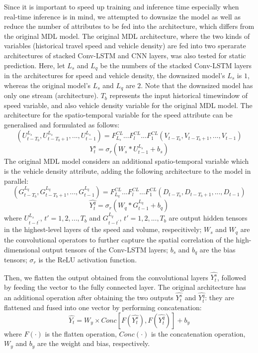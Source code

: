 \documentclass[11pt]{uonthesis}
\begin{document}
Since it is important to speed up training and inference time especially when real-time inference is in mind, we attempted to downsize the model as well as reduce the number of attributes to be fed into the architecture, which differs from the original MDL model. The original MDL architecture, where the two kinds of variables (historical travel speed and vehicle density) are fed into two sperarate architectures of stacked Conv-LSTM and CNN layers, was also tested for static prediction. Here, let $L_s$ and $L_q$ be the numbers of the stacked Conv-LSTM layers in the architectures for speed and vehicle density, the downsized model's $L_s$ is $1$, whereas the original model's $L_s$ and $L_q$ are $2$. Note that the downsized model has only one stream (architecture). $T_b$ represents the input historical timewindow of speed variable, and also vehicle density variable for the original MDL model. The architecture for the spatio-temporal variable for the speed attribute can be generalised and formulated as follows:
\[ (U^{L_s}_{t-T_b}, U^{L_s}_{t-T_b+1},..., U^{L_s}_{t-1}) = F^{CL}_{L_s}...F^{CL}_{l}...F^{CL}_{1} (V_{t-T_b}, V_{t-T_b+1},..., V_{t-1}) \]
\[ \hat{Y^s_{t}} = {\sigma}_r (W_s\ast{U^{L_s}_{t-1}} + b_s) \]
The original MDL model considers an additional spatio-temporal variable which is the vehicle density attribute, adding the following architecture to the model in parallel:
\[ (G^{L_q}_{t-T_b}, G^{L_q}_{t-T_b+1},...,G^{L_q}_{t-1}) = F^{CL}_{L_q}...F^{CL}_{l}...F^{CL}_{1} (D_{t-T_b}, D_{t-T_b+1},..., D_{t-1}) \]
\[ \hat{Y^q_{t}} = {\sigma}_r (W_q\ast{G^{L_q}_{t-1}} + b_q) \]
where $U^{L_s}_{t-t^{\prime}}$, $t\prime = 1, 2,..., T_b$ and $G^{L_q}_{t-t^{\prime}}$, $t\prime = 1, 2,..., T_b$ are output hidden tensors in the highest-level layers of the speed and volume, respecitively; $W_s$ and $W_q$ are the convolutional operators to further capture the spatial correlation of the high-dimensional output tensors of the Conv-LSTM layers; $b_s$ and $b_q$ are the bias tensors; $\sigma_r$ is the ReLU activation function.

Then, we flatten the output obtained from the convolutional layers $\hat{Y^{s}_t}$, followed by feeding the vector to the fully connected layer. The original architecture has an additional operation after obtaining the two outputs $\hat{Y^{s}_t}$ and $\hat{Y^q_t}$: they are flattened and fused into one vector by performing concatenation:
\[ \hat{Y_t} = W_y \times Conc[F(\hat{Y^s_t}), F(\hat{Y^q_t})] + b_y\]
where $F(\cdot)$ is the flatten operation, $Conc(\cdot)$ is the concatenation operation, $W_y$ and $b_y$ are the weight and bias, respectively. %
\end{document}
